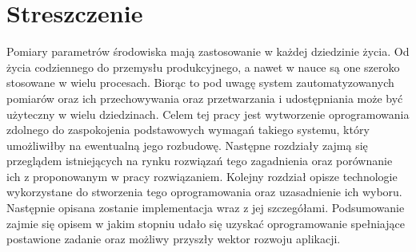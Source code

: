 \chapter*{Streszczenie}
Pomiary parametrów środowiska mają zastosowanie w każdej dziedzinie życia.
Od życia codziennego do przemysłu produkcyjnego, a nawet w nauce są one 
szeroko stosowane w wielu procesach. Biorąc to pod uwagę system zautomatyzowanych
pomiarów oraz ich przechowywania oraz przetwarzania i udostępniania może
być użyteczny w wielu dziedzinach. Celem tej pracy jest wytworzenie
oprogramowania zdolnego do zaspokojenia podstawowych wymagań takiego systemu,
który umożliwiłby na ewentualną jego rozbudowę. Następne rozdziały zajmą się
przeglądem istniejących na rynku rozwiązań tego zagadnienia oraz porównanie ich
z proponowanym w pracy rozwiązaniem. Kolejny rozdział opisze technologie
wykorzystane do stworzenia tego oprogramowania oraz uzasadnienie ich wyboru.
Następnie opisana zostanie implementacja wraz z jej szczegółami.
Podsumowanie zajmie się opisem w jakim stopniu udało się uzyskać oprogramowanie
spełniające postawione zadanie oraz możliwy przyszły wektor rozwoju aplikacji.
